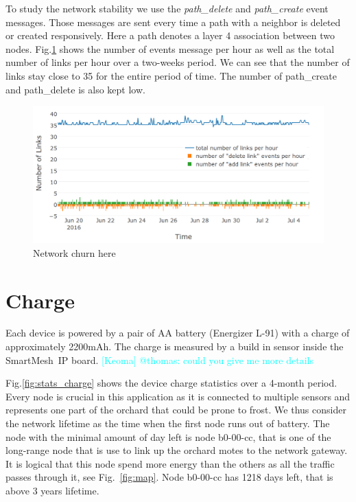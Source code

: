 \documentclass{sig-alternate}
\newcommand{\keoma}[1]              {\textcolor{cyan}{[Keoma] #1}}
\newcommand{\smip}                  {SmartMesh~IP\xspace}
\begin{document}
%

To study the network stability we use the \textit{path\_delete} and \textit{path\_create} event messages.
Those messages are sent every time a path with a neighbor is deleted or created responsively.
Here a path denotes a layer 4 association between two nodes.
Fig.\ref{fig:net_churn} shows the number of events message per hour as well as the total number of links per hour over a two-weeks period.
We can see that the number of links stay close to 35 for the entire period of time.
The number of path\_create and path\_delete is also kept low.

\begin{figure}
    \centering
    \includegraphics[width=\columnwidth]{net_churn}
    \caption{Network churn here}
    \label{fig:net_churn}
\end{figure}

\section{Charge}
\label{sec:charge}


Each device is powered by a pair of AA battery (Energizer L-91) with a charge of approximately 2200mAh.
The charge is measured by a build in sensor inside the \smip board. \keoma{@thomas: could you give me more details}

%

Fig.\ref{fig:stats_charge} shows the device charge statistics over a 4-month period.
Every node is crucial in this application as it is connected to multiple sensors and represents one part of the orchard that could be prone to frost.
We thus consider the network lifetime as the time when the first node runs out of battery.
The node with the minimal amount of day left is node b0-00-cc, that is one of the long-range node that is use to link up the orchard motes to the network gateway.
It is logical that this node spend more energy than the others as all the traffic passes through it, see Fig.~\ref{fig:map}.
Node b0-00-cc has 1218 days left, that is above 3 years lifetime.
\end{document}
